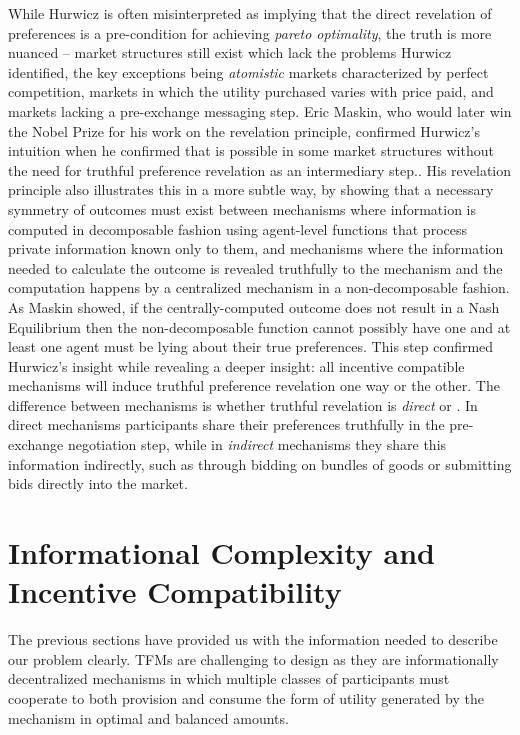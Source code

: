 \documentclass[sigconf,anonymous]{aamas}
\begin{document}
While Hurwicz is often misinterpreted as implying that the direct revelation of preferences is a pre-condition for achieving \textit{pareto optimality}, the truth is more nuanced -- market structures still exist which lack the problems Hurwicz identified, the key exceptions being \textit{atomistic} markets characterized by perfect competition, markets in which the utility purchased varies with price paid, and markets lacking a pre-exchange messaging step. Eric Maskin, who would later win the Nobel Prize for his work on the revelation principle, confirmed Hurwicz's intuition when he confirmed that  is possible in some market structures without the need for truthful preference revelation as an intermediary step.\citet{maskin1999nash}. His revelation principle also illustrates this in a more subtle way, by showing that a necessary symmetry of outcomes must exist between mechanisms where information is computed in decomposable fashion using agent-level functions that process private information known only to them, and mechanisms where the information needed to calculate the outcome is revealed truthfully to the mechanism and the computation happens by a centralized mechanism in a non-decomposable fashion. As Maskin showed, if the centrally-computed outcome does not result in a Nash Equilibrium then the non-decomposable function cannot possibly have one and at least one agent must be lying about their true preferences. This step confirmed Hurwicz's insight while revealing a deeper insight: all incentive compatible mechanisms will induce truthful preference revelation one way or the other. The difference between mechanisms is whether truthful revelation is \textit{direct} or . In direct mechanisms participants share their preferences truthfully in the pre-exchange negotiation step, while in \textit{indirect} mechanisms they share this information indirectly, such as through bidding on bundles of goods or submitting bids directly into the market.

\section{Informational Complexity and Incentive Compatibility\label{sec::section1p3}}

The previous sections have provided us with the information needed to describe our problem clearly. TFMs are challenging to design as they are informationally decentralized mechanisms in which multiple classes of participants must cooperate to both provision and consume the form of utility generated by the mechanism in optimal and balanced amounts.
\end{document}
